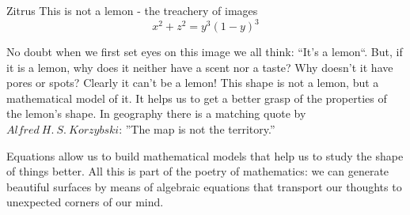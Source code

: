 \begin{surferPage}{Zitrus}
This is not a lemon - the treachery of images\\
\smallskip
\[x^2 + z^2 = y^3 (1 - y)^3\] 


\singlespacing
No doubt when we first set eyes on this image we all think: ``It's a lemon``. But, if it is a lemon, why does it neither have a scent nor a taste? Why doesn't it have pores or spots? Clearly it can't be a lemon! 
\singlespacing
This shape is not a lemon, but a mathematical model of it. It helps us to get a better grasp of the properties of the lemon's shape. In geography there is a matching quote by $Alfred\ H.\ S.\ Korzybski$: ''The map is not the territory.'' \\
\singlespacing

Equations allow us to build mathematical models that help us to study the shape of things better. 
\singlespacing
All this is part of the poetry of mathematics: we can generate beautiful surfaces by means of algebraic equations that transport our thoughts to unexpected corners of our mind.
\end{surferPage}
